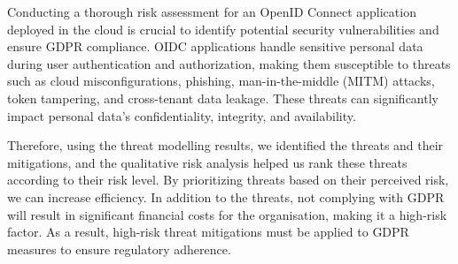 Conducting a thorough risk assessment for an OpenID Connect application deployed in the cloud is crucial to identify potential security vulnerabilities and ensure GDPR compliance. OIDC applications handle sensitive personal data during user authentication and authorization, making them susceptible to threats such as cloud misconfigurations, phishing, man-in-the-middle (MITM) attacks, token tampering, and cross-tenant data leakage. These threats can significantly impact personal data's confidentiality, integrity, and availability. 

Therefore, using the threat modelling results, we identified the threats and their mitigations, and the qualitative risk analysis helped us rank these threats according to their risk level. By prioritizing threats based on their perceived risk, we can increase efficiency. In addition to the threats, not complying with GDPR will result in significant financial costs for the organisation, making it a high-risk factor. As a result, high-risk threat mitigations must be applied to GDPR measures to ensure regulatory adherence. 








